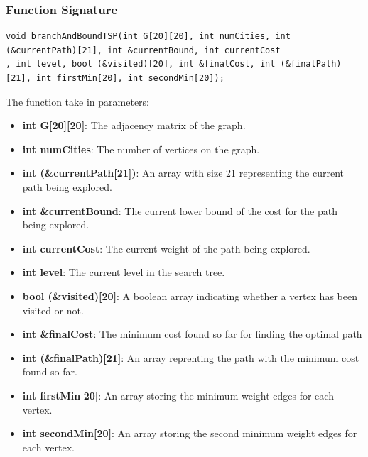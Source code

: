 \documentclass[a4paper]{article}
\begin{document}
\subsubsection{Function Signature}
\begin{verbatim}
void branchAndBoundTSP(int G[20][20], int numCities, int (&currentPath)[21], int &currentBound, int currentCost
, int level, bool (&visited)[20], int &finalCost, int (&finalPath)[21], int firstMin[20], int secondMin[20]);
\end{verbatim}
The function take in parameters:
\begin{itemize}
    \item \textbf{int G[20][20]}: The adjacency matrix of the graph.
    \item \textbf{int numCities}: The number of vertices on the graph.
    \item \textbf{int (\&currentPath[21])}: An array with size 21 representing the current path being explored.
    \item \textbf{int \&currentBound}: The current lower bound of the cost for the path being explored.
    \item \textbf{int currentCost}: The current weight of the path being explored.
    \item \textbf{int level}: The current level in the search tree. 
    \item \textbf{bool (\&visited)[20]}: A boolean array indicating whether a vertex has been visited or not.
    \item \textbf{int \&finalCost}: The minimum cost found so far for finding the optimal path
    \item \textbf{int (\&finalPath)[21]}: An array reprenting the path with the minimum cost found so far.
    \item \textbf{int firstMin[20]}: An array storing the minimum weight edges for each vertex.
    \item \textbf{int secondMin[20]}: An array storing the second minimum weight edges for each vertex.
\end{itemize}
\end{document}
